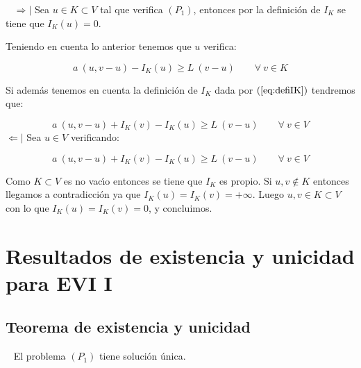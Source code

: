 \begin{demosejer}
\ \newline
$\Rightarrow |$ Sea $u \in K \subset V$ tal que verifica $(P_1)$, entonces por
la definici\'on de $I_K$ se tiene que $I_K(u) = 0$.\newline

Teniendo en cuenta lo anterior tenemos que $u$ verifica:

\begin{displaymath}
a\ (u,v-u)-I_K(u) \ge L\ (v-u) \qquad \forall \ v \in K
\end{displaymath}

Si adem\'as tenemos en cuenta la definici\'on de $I_K$ dada por
$(\ref{eq:defiIK})$ tendremos que:

\begin{displaymath}
a\ (u,v-u)+I_K(v)-I_K(u) \ge L\ (v-u) \qquad \forall \ v \in V
\end{displaymath}
$\Leftarrow |$ Sea $u \in V$ verificando:

\begin{displaymath}
a\ (u,v-u) + I_K(v) - I_K(u) \ge L\ (v-u) \qquad \forall \ v \in V
\end{displaymath}

Como $K \subset V$ es no vac\'{\i}o entonces se tiene que $I_K$ es propio. Si
$u,v \notin K$ entonces llegamos a contradicci\'on ya que $I_K(u)=I_K(v)=+
\infty$. Luego $u,v \in K \subset V$ con lo que $I_K(u)=I_K(v) = 0$, y 
concluimos.
\end{demosejer}

\section{Resultados de existencia y unicidad para EVI I}

\subsection{Teorema de existencia y unicidad}

\begin{teorema} \label{th:exisEVII}
\ \newline \newline
El problema $(P_1)$ tiene soluci\'on \'unica.
\end{teorema}

